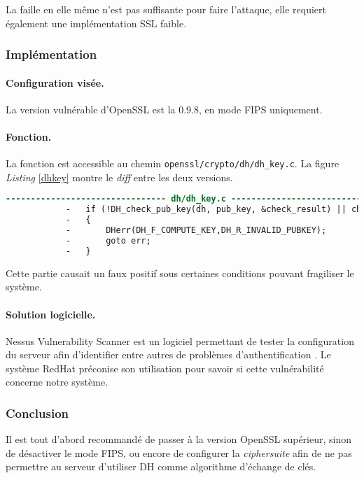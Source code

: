 		La faille en elle même n'est pas suffisante pour faire l'attaque, elle requiert également une implémentation SSL faible. 
	
		\subsubsection{Implémentation}
		
			\paragraph{Configuration visée.\\}
		
			La version vulnérable d'OpenSSL est la 0.9.8, en mode FIPS uniquement.

			\paragraph{Fonction.\\}

			La fonction est accessible au chemin \texttt{openssl/crypto/dh/dh\_key.c}. La figure \textit{Listing} \ref{dhkey} montre le \textit{diff} entre les deux versions.

			\begin{lstlisting}[language=diff,caption=dh\_key.c, label=dhkey]
			-------------------------------- dh/dh_key.c --------------------------------
			-	if (!DH_check_pub_key(dh, pub_key, &check_result) || check_result)
			-	{
			-		DHerr(DH_F_COMPUTE_KEY,DH_R_INVALID_PUBKEY);
			-		goto err;
			-	}
			\end{lstlisting}

			Cette partie causait un faux positif sous certaines conditions pouvant fragiliser le système.

			\paragraph{Solution logicielle.\\}

			Nessus Vulnerability Scanner est un logiciel permettant de tester la configuration du serveur afin d'identifier entre autres de problèmes d'authentification \cite{nessus}. Le système RedHat préconise son utilisation pour savoir si cette vulnérabilité concerne notre système.
		
	\subsubsection{Conclusion}

		Il est tout d'abord recommandé de passer à la version OpenSSL supérieur, sinon de désactiver le mode FIPS, ou encore de configurer la \textit{ciphersuite} afin de ne pas permettre au serveur d'utiliser DH comme algorithme d'échange de clés.
